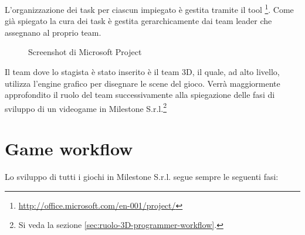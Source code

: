 L'organizzazione dei task per ciascun impiegato è gestita tramite il tool \footnote{\url{http://office.microsoft.com/en-001/project/}}. Come già spiegato la cura dei task è gestita gerarchicamente dai team leader che assegnano al proprio team.\\

\begin{figure}
	\centering
	\caption{Screenshot di Microsoft Project}
	\label{fig:screenshot-microsoft-project}
\end{figure}

Il team dove lo stagista è stato inserito è il team 3D, il quale, ad alto livello, utilizza l'engine grafico per disegnare le scene del gioco. Verrà maggiormente approfondito il ruolo del team successivamente alla spiegazione delle fasi di sviluppo di un videogame in Milestone S.r.l.\footnote{Si veda la sezione \ref{sec:ruolo-3D-programmer-workflow}.}

\section{Game workflow}

Lo sviluppo di tutti i giochi in Milestone S.r.l. segue sempre le seguenti fasi:

